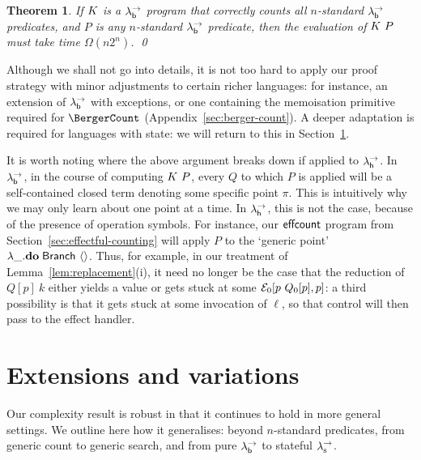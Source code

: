 \documentclass[12pt,phd,lfcs,twoside,openright,logo,leftchapter,normalheadings]{infthesis}
\theoremstyle{plain}
\newtheorem{theorem}{Theorem}[chapter]
\theoremstyle{definition}
\begin{document}
\begin{theorem}
  If $K$ is a $\lambda^\rightarrow_{\mathsf{b}}$ program that correctly counts all
  $n$-standard $\lambda^\rightarrow_{\mathsf{b}}$ predicates, and $P$ is any $n$-standard
  $\lambda^\rightarrow_{\mathsf{b}}$ predicate, then the evaluation of $K~P$ must take
  time $\Omega(n2^n)$.  \qed
\end{theorem}

Although we shall not go into details, it is not too hard to apply our
proof strategy with minor adjustments to certain richer languages: for
instance, an extension of $\lambda^\rightarrow_{\mathsf{b}}$ with exceptions, or one containing
the memoisation primitive required for $\BergerCount$
(Appendix~\ref{sec:berger-count}). A deeper adaptation is required for
languages with state: we will return to this in
Section~\ref{sec:robustness}.

It is worth noting where the above argument breaks down if applied to
$\lambda^\rightarrow_{\mathsf{h}}$.  In $\lambda^\rightarrow_{\mathsf{b}}$, in the course of computing $K~P$, every
$Q$ to which $P$ is applied will be a self-contained closed term
denoting some specific point $\pi$.  This is intuitively why we may
only learn about one point at a time.  In $\lambda^\rightarrow_{\mathsf{h}}$, this is not the
case, because of the presence of operation symbols.  For instance, our
$\mathsf{effcount}$ program from Section~\ref{sec:effectful-counting} will apply
$P$ to the `generic point' $\lambda\_.\mathbf{do}\;\mathsf{Branch}~\langle  \rangle$.  Thus, for example, in our
treatment of Lemma~\ref{lem:replacement}(i), it need no longer be the
case that the reduction of $Q[p]~k$ either yields a value or gets
stuck at some $\mathcal{E}_0[p~Q_0[p],p]$: a third possibility is that it gets
stuck at some invocation of $\ell$, so that control will then pass to
the effect handler.

\section{Extensions and variations}
\label{sec:robustness}

Our complexity result is robust in that it continues to hold in more
general settings. We outline here how it generalises: beyond
$n$-standard predicates, from generic count to generic search, and
from pure $\lambda^\rightarrow_{\mathsf{b}}$ to stateful $\lambda^\rightarrow_{\textrm{\normalfont s}}$.
\end{document}
